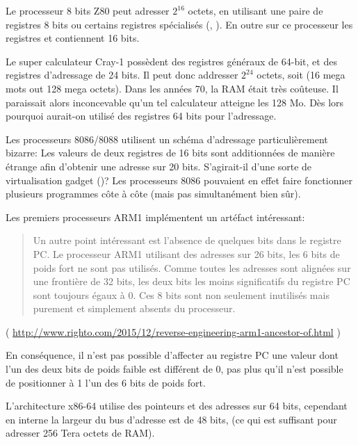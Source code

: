 Le processeur 8 bits Z80 peut adresser $2^{16}$ octets, en utilisant une paire de registres 8 bits ou certains registres
spécialisés (, ). En outre sur ce processeur les registres  et  contiennent 16 bits.

Le super calculateur Cray-1 possèdent des registres généraux de 64-bit, et des registres d'adressage de 24 bits.
Il peut donc addresser $2^{24}$ octets, soit (16 mega mots out 128 mega octets).
Dans les années 70, la RAM était très coûteuse. Il paraissait alors inconcevable qu'un tel calculateur atteigne
les 128 Mo. Dès lors pourquoi aurait-on utilisé des registres 64 bits pour l'adressage.

Les processeurs 8086/8088 utilisent un schéma d'adressage particulièrement bizarre:
Les valeurs de deux registres de 16 bits sont additionnées de manière étrange afin d'obtenir une adresse sur 20 bits.
S'agirait-il d'une sorte de virtualisation gadget ()?
Les processeurs 8086 pouvaient en effet faire fonctionner plusieurs programmes côte à côte (mais pas simultanément bien sûr).

Les premiers processeurs ARM1 implémentent un artéfact intéressant:

\begin{framed}
\begin{quotation}
Un autre point intéressant est l'absence de quelques bits dans le registre PC. Le processeur ARM1 utilisant des adresses
sur 26 bits, les 6 bits de poids fort ne sont pas utilisés. Comme toutes les adresses sont alignées sur une frontière de
32 bits, les deux bits les moins significatifs du registre PC sont toujours égaux à 0. Ces 8 bits sont non seulement
inutilisés mais purement et simplement absents du processeur.
\end{quotation}
\end{framed}

( \url{http://www.righto.com/2015/12/reverse-engineering-arm1-ancestor-of.html} )

En conséquence, il n'est pas possible d'affecter au registre PC une valeur dont l'un des deux bits de poids faible est
différent de 0, pas plus qu'il n'est possible de positionner à 1 l'un des 6 bits de poids fort.

L'architecture x86-64 utilise des pointeurs et des adresses sur 64 bits, cependant en interne la largeur du bus
d'adresse est de 48 bits, (ce qui est suffisant pour adresser 256 Tera octets de \ac{RAM}).

